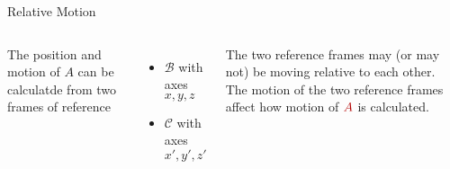 \documentclass[12pt,compress,aspectratio=169]{beamer}
\begin{document}
\begin{frame}{Relative Motion}
  \begin{columns}

    The position and motion of $A$ can be calculatde from two frames of
    reference
    \begin{itemize}
    \item $\mathcal{B}$ with axes $x,y,z$
    \item $\mathcal{C}$ with axes $x',y',z'$
    \end{itemize}
    The two reference frames may (or may not) be moving relative to each other.
    The motion of the two reference frames affect how motion of
    $\textcolor{red!70!black}{A}$ is calculated.
  \end{columns}
\end{frame}
\end{document}
